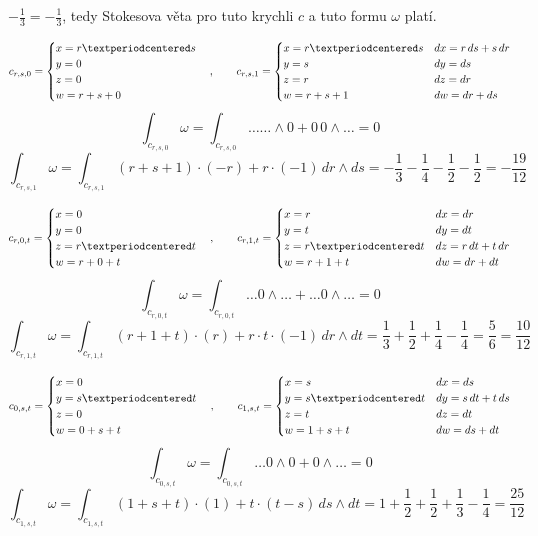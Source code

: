 \documentclass[12pt]{article}					%
\begin{document}
\begin{priklad}[1.]
\begin{reseni}
            $-\frac{1}{3} = -\frac{1}{3}$, tedy Stokesova věta pro tuto krychli $c$ a tuto formu $\omega$ platí.    
        \end{reseni}

        \begin{reseni}
            $$ c_{r, s, 0} = \begin{cases} x = r·s \\ y = 0 \\ z = 0 \\ w = r + s + 0 \end{cases}, \hskip 2em
            c_{r, s, 1} = \begin{cases} x = r·s & dx = r\,ds + s\,dr \\ y = s & dy = ds \\ z = r & dz = dr \\ w = r + s + 1 & dw = dr + ds \end{cases} $$
            $$ \int_{c_{r, s, 0}}\omega = \int_{c_{r, s, 0}}… …\wedge 0 + 0\,0\wedge… = 0 $$ 
            $$ \int_{c_{r, s, 1}}\omega = \int_{c_{r, s, 1}}(r+s+1)·(-r) + r·(-1)\, dr\wedge ds = -\frac{1}{3} - \frac{1}{4} - \frac{1}{2} - \frac{1}{2} = -\frac{19}{12} $$ 

            $$ c_{r, 0, t} = \begin{cases} x = 0 \\ y = 0 \\ z = r·t \\ w = r + 0 + t \end{cases}, \hskip 2em
            c_{r, 1, t} = \begin{cases} x = r & dx = dr \\ y = t & dy = dt \\ z = r·t & dz = r\,dt + t\,dr \\ w = r + 1 + t & dw = dr + dt \end{cases} $$
            $$ \int_{c_{r, 0, t}}\omega = \int_{c_{r, 0, t}}… 0\wedge … + … 0\wedge… = 0 $$ 
            $$ \int_{c_{r, 1, t}}\omega = \int_{c_{r, 1, t}}(r+1+t)·(r) + r·t·(-1)\, dr\wedge dt = \frac{1}{3} + \frac{1}{2} + \frac{1}{4} - \frac{1}{4} = \frac{5}{6} = \frac{10}{12} $$

            $$ c_{0, s, t} = \begin{cases} x = 0 \\ y = s·t \\ z = 0 \\ w = 0 + s + t \end{cases}, \hskip 2em
            c_{1, s, t} = \begin{cases} x = s & dx = ds \\ y = s·t & dy = s\,dt + t\,ds \\ z = t & dz = dt \\ w = 1 + s + t & dw = ds + dt \end{cases} $$
            $$ \int_{c_{0, s, t}}\omega = \int_{c_{0, s, t}}… 0\wedge 0 + 0 \wedge… = 0 $$ 
            $$ \int_{c_{1, s, t}}\omega = \int_{c_{1, s, t}}(1+s+t)·(1) + t·(t-s)\, ds\wedge dt = 1 + \frac{1}{2} + \frac{1}{2} + \frac{1}{3} - \frac{1}{4} = \frac{25}{12} $$
        \end{reseni}
    \end{priklad}
\end{document}
